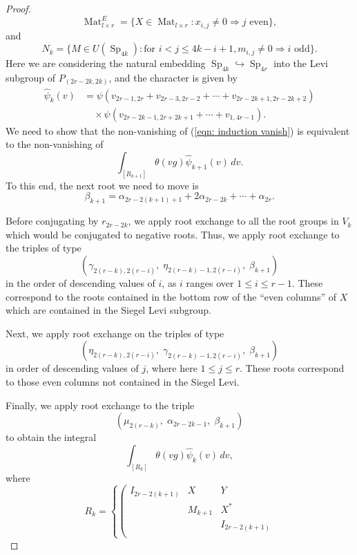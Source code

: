 \documentclass[11pt,reqno]{amsart}
\theoremstyle{definition}
\theoremstyle{remark}
\theoremstyle{definition}
\begin{document}
\begin{proof}
\[
 \operatorname{Mat}^E_{l\times r}= \{ X \in \operatorname{Mat}_{l\times r}: x_{i,j}\neq0 \Rightarrow j \mbox{ even}\},
\]
and
\[
N_k = \{ M\in U(\operatorname{Sp}_{4k}) : \mbox{for } i<j\leq 4k-i+1, m_{i,j}\neq 0 \Rightarrow i\mbox{ odd}\}.
\]
Here we are considering the natural embedding $\operatorname{Sp}_{4k}{\hookrightarrow} \operatorname{Sp}_{4r}$ into the Levi subgroup of $P_{(2r-2k,2k)}$, and the character is given by
\begin{align*}
 \hat{\psi}_{k}(v) &= \psi(v_{2r-1,2r} + v_{2r-3,2r-2}+\cdots +v_{2r-2k+1,2r-2k+2})\\
				 &\quad\times \psi(v_{2r-2k-1, 2r+2k+1}+\cdots + v_{1,4r-1}).
\end{align*}
We need to show that the non-vanishing of (\ref{eqn: induction vanish}) is equivalent to the non-vanishing of 
\[
\displaystyle \int_{[R_{k+1}]} \theta(vg) \hat{\psi}_{k+1}(v)\,dv.
\]
To this end,  the next root we need to move is 
$${\beta}_{k+1} = {\alpha}_{2r-2(k+1)+1}+2{\alpha}_{2r-2k}+\cdots +{\alpha}_{2r}.$$ 

Before conjugating by $r_{2r-2k}$, we apply root exchange to all the root groups in $V_k$ which would be conjugated to negative roots. Thus, we apply root exchange to the triples of type
 $$({\gamma}_{2(r-k),2(r-i)},\;\eta_{2(r-k)-1,2(r-i)},\;{\beta}_{k+1})$$
 in the order of descending values of $i$, as $i$ ranges over $1\leq i\leq r-1$. These correspond to the roots contained in the bottom row of the ``even columns'' of $X$ which are contained in the Siegel Levi subgroup. 

 Next, we apply root exchange on the triples of type
 $$(\eta_{2(r-k),2(r-i)},\;{\gamma}_{2(r-k)-1,2(r-i)},\;{\beta}_{k+1})$$
 in order of descending values of $j$, where here $1\leq j \leq r$. These roots correspond to those even columns not contained in the Siegel Levi.

 Finally, we apply root exchange to the triple
 $$(\mu_{2(r-k)},\; {\alpha}_{2r-2k-1},\;{\beta}_{k+1})$$ 
to obtain the integral
\[
\displaystyle \int_{[R_{k}]} \theta(vg) \hat{\psi}_{k}(v)\,dv,
\]
where
\[
R_{k} = \left\{ \left( \begin{array}{ccc}
									I_{2r-2(k+1)}&X&Y\\
									&M_{k+1}&X^*\\
									&&I_{2r-2(k+1)}\\
									

\end{array}\]
\end{proof}
\end{document}
